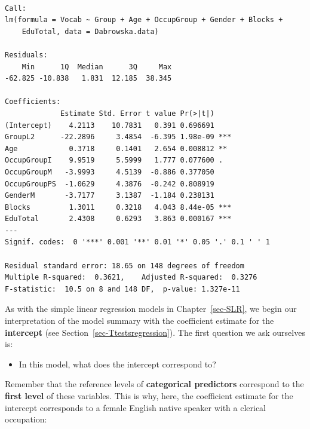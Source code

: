 \documentclass[
  letterpaper,
  DIV=11,
  numbers=noendperiod]{scrreprt}
\newenvironment{Shaded}{\begin{snugshade}}{\end{snugshade}}
\newcommand{\CommentTok}[1]{\textcolor[rgb]{0.37,0.37,0.37}{#1}}
\newcommand{\FunctionTok}[1]{\textcolor[rgb]{0.28,0.35,0.67}{#1}}
\newcommand{\NormalTok}[1]{\textcolor[rgb]{0.00,0.23,0.31}{#1}}
\newcommand{\SpecialCharTok}[1]{\textcolor[rgb]{0.37,0.37,0.37}{#1}}
\providecommand{\tightlist}{%
  \setlength{\itemsep}{0pt}\setlength{\parskip}{0pt}}
\begin{document}
\begin{verbatim}

Call:
lm(formula = Vocab ~ Group + Age + OccupGroup + Gender + Blocks + 
    EduTotal, data = Dabrowska.data)

Residuals:
    Min      1Q  Median      3Q     Max 
-62.825 -10.838   1.831  12.185  38.345 

Coefficients:
             Estimate Std. Error t value Pr(>|t|)    
(Intercept)    4.2113    10.7831   0.391 0.696691    
GroupL2      -22.2896     3.4854  -6.395 1.98e-09 ***
Age            0.3718     0.1401   2.654 0.008812 ** 
OccupGroupI    9.9519     5.5999   1.777 0.077600 .  
OccupGroupM   -3.9993     4.5139  -0.886 0.377050    
OccupGroupPS  -1.0629     4.3876  -0.242 0.808919    
GenderM       -3.7177     3.1387  -1.184 0.238131    
Blocks         1.3011     0.3218   4.043 8.44e-05 ***
EduTotal       2.4308     0.6293   3.863 0.000167 ***
---
Signif. codes:  0 '***' 0.001 '**' 0.01 '*' 0.05 '.' 0.1 ' ' 1

Residual standard error: 18.65 on 148 degrees of freedom
Multiple R-squared:  0.3621,    Adjusted R-squared:  0.3276 
F-statistic:  10.5 on 8 and 148 DF,  p-value: 1.327e-11
\end{verbatim}

As with the simple linear regression models in Chapter~\ref{sec-SLR}, we
begin our interpretation of the model summary with the coefficient
estimate for the \textbf{intercept} (see
Section~\ref{sec-Ttestsregression}). The first question we ask ourselves
is:

\begin{itemize}
\tightlist
\item
  In this model, what does the intercept correspond to?
\end{itemize}

Remember that the reference levels of \textbf{categorical predictors}
correspond to the \textbf{first level} of these variables. This is why,
here, the coefficient estimate for the intercept corresponds to a female
English native speaker with a clerical occupation:

\begin{Shaded}
\end{Shaded}
\end{document}
